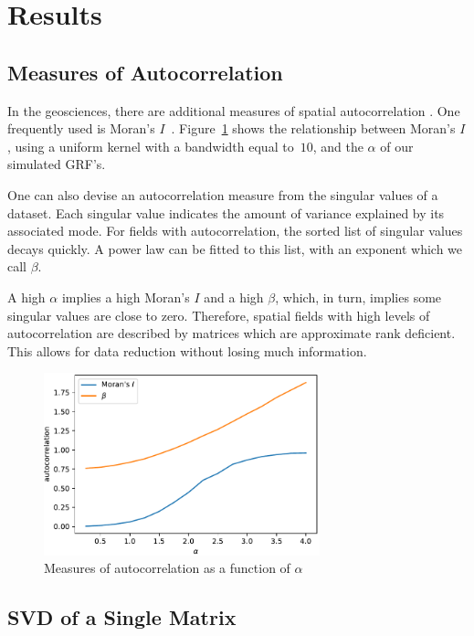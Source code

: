 \documentclass[ijgi,article,submit,moreauthors,pdftex,10pt,a4paper]{Definitions/mdpi}
\begin{document}
\section{Results}
\label{sec:Results}

\subsection{Measures of Autocorrelation}
\label{sec:Materials and Methods/Measures of Autocorrelation}
In the geosciences, there are additional measures of spatial autocorrelation \cite{Eshel2011, Storch1999}. One frequently used is Moran's $I$~\cite{Moran1950, Hubert1981, PySAL}. Figure~\ref{fig:plotMoransIAndBeta} shows the relationship between Moran's $I$, using a uniform kernel with a bandwidth equal to~$10$, and the $\alpha$ of our simulated GRF's.

One can also devise an autocorrelation measure from the singular values of a dataset. Each singular value indicates the amount of variance explained by its associated mode. For fields with autocorrelation, the sorted list of singular values decays quickly. A power law can be fitted to this list, with an exponent which we call $\beta$.

A high $\alpha$ implies a high Moran's $I$ and a high $\beta$, which, in turn, implies some singular values are close to zero. Therefore, spatial fields with high levels of autocorrelation are described by matrices which are approximate rank deficient. This allows for data reduction without losing much information.

\begin{figure}[H]
\centering
\includegraphics[width=80mm]{Results/plotMoransIAndBeta.pdf}
\caption[Various measures of autocorrelation]{Measures of autocorrelation as a function of $\alpha$}
\label{fig:plotMoransIAndBeta}
\end{figure}

\subsection{SVD of a Single Matrix} %
\label{sec:Results/SVD of a Single Matrix}
\end{document}
